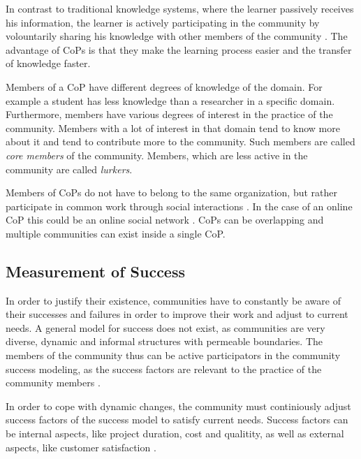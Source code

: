 In contrast to traditional knowledge systems, where the learner passively receives his information, the learner is actively participating in the community by volountarily sharing his knowledge with other members of the community \cite{AMMi15,Kern08}.
The advantage of CoPs is that they make the learning process easier\cite{SaAr05} and the transfer of knowledge faster\cite{CuZe05}.

Members of a CoP have different degrees of knowledge of the domain.
For example a student has less knowledge than a researcher in a specific domain.
Furthermore, members have various degrees of interest in the practice of the community.
Members with a lot of interest in that domain tend to know more about it and tend to contribute more to the community.
Such members are called \emph{core members} of the community.
Members, which are less active in the community are called \emph{lurkers}.

Members of CoPs do not have to belong to the same organization, but rather participate in common work through social interactions \cite{Weng98}. In the case of an online CoP this could be an online social network \cite{CuZe05}. CoPs can be overlapping and multiple communities can exist inside a single CoP.

\subsection{Measurement of Success}
In order to justify their existence, communities have to constantly be aware of their successes and failures in order to improve their work and adjust to current needs.
A general model for success does not exist, as communities are very diverse, dynamic and informal structures with permeable boundaries.
The members of the community thus can be active participators in the community success modeling, as the success factors are relevant to the practice of the community members \cite{RKJa15}.

In order to cope with dynamic changes, the community must continiously adjust success factors of the success model to satisfy current needs. Success factors can be internal aspects, like project duration, cost and qualitity, as well as external aspects, like customer satisfaction \cite{AgRa06}.

